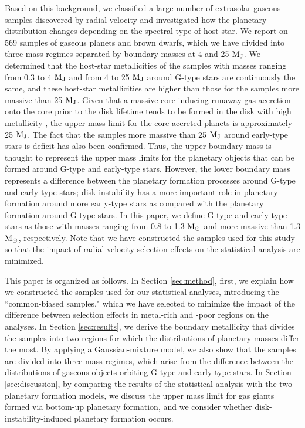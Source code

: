 \documentclass[twocolumn]{aastex62}
\begin{document}
\begin{CJK*}{UTF8}{min}
Based on this background, we classified a large number of extrasolar gaseous samples discovered by radial velocity and investigated how the planetary distribution changes depending on the spectral type of host star. We report on 569 samples of gaseous planets and brown dwarfs, which we have divided into three mass regimes separated by boundary masses at 4 and 25 $\rm M_J$. We determined that the host-star metallicities of the samples with masses ranging from 0.3 to 4 $\rm M_J$ and from 4 to 25 $\rm M_J$ around G-type stars are continuously the same, and these host-star metallicities are higher than those for the samples more massive than 25 $\rm M_J$. Given that a massive core-inducing runaway gas accretion onto the core prior to the disk lifetime tends to be formed in the disk with high metallicity \citep{2004ApJ...616..567I, 2012A&A...541A..97M}, the upper mass limit for the core-accreted planets is approximately 25 $\rm M_J$. The fact that the samples more massive than 25 $\rm M_J$ around early-type stars is deficit has also been confirmed. Thus, the upper boundary mass is thought to represent the upper mass limits for the planetary objects that can be formed around G-type and early-type stars. However, the lower boundary mass represents a difference between the planetary formation processes around G-type and early-type stars; disk instability has a more important role in planetary formation around more early-type stars as compared with the planetary formation around G-type stars. In this paper, we define G-type and early-type stars as those with masses ranging from 0.8 to 1.3 $\rm M_{\odot}$ and more massive than 1.3 $\rm M_{\odot}$, respectively. Note that we have constructed the samples used for this study so that the impact of radial-velocity selection effects on the statistical analysis are minimized. 

This paper is organized as follows. In Section \ref{sec:method}, first, we explain how we constructed the samples used for our statistical analyses, introducing the ``common-biased samples," which we have selected to minimize the impact of the difference between selection effects in metal-rich and -poor regions on the analyses. In Section \ref{sec:results}, we derive the boundary metallicity that divides the samples into two regions for which the distributions of planetary masses differ the most. By applying a Gaussian-mixture model, we also show that the samples are divided into three mass regimes, which arise from the difference between the distributions of gaseous objects orbiting G-type and early-type stars. In Section \ref{sec:discussion}, by comparing the results of the statistical analysis with the two planetary formation models, we discuss the upper mass limit for gas giants formed via bottom-up planetary formation, and we consider whether disk-instability-induced planetary formation occurs.



\end{CJK*}
\end{document}
